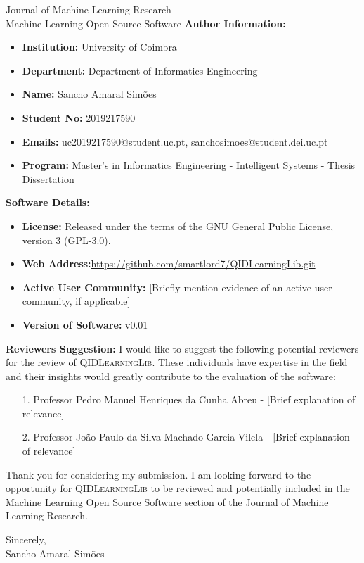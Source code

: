 \documentclass{letter}
\begin{document}
\begin{letter}{Journal of Machine Learning Research\\
    Machine Learning Open Source Software
}
\textbf{Author Information:}
\begin{itemize}
    \item \textbf{Institution:} University of Coimbra
    \item \textbf{Department:} Department of Informatics Engineering
    \item \textbf{Name:} Sancho Amaral Simões
    \item \textbf{Student No:} 2019217590
    \item \textbf{Emails:} uc2019217590@student.uc.pt, sanchosimoes@student.dei.uc.pt
    \item \textbf{Program:} Master's in Informatics Engineering - Intelligent Systems - Thesis Dissertation
\end{itemize}

\textbf{Software Details:}
\begin{itemize}
    \item \textbf{License:} Released under the terms of the GNU General Public License, version 3 (GPL-3.0).
    \item \textbf{Web Address:}\url{https://github.com/smartlord7/QIDLearningLib.git}
    \item \textbf{Active User Community:} [Briefly mention evidence of an active user community, if applicable]
    \item \textbf{Version of Software:} v0.01
\end{itemize}

\textbf{Reviewers Suggestion:}
I would like to suggest the following potential reviewers for the review of \textsc{QIDLearningLib}. These individuals have expertise in the field and their insights would greatly contribute to the evaluation of the software:
\begin{enumerate}
    \item [1.] Professor Pedro Manuel Henriques da Cunha Abreu - [Brief explanation of relevance]
    \item [2.] Professor João Paulo da Silva Machado Garcia Vilela - [Brief explanation of relevance]
\end{enumerate}

Thank you for considering my submission. I am looking forward to the opportunity for \textsc{QIDLearningLib} to be reviewed and potentially included in the Machine Learning Open Source Software section of the Journal of Machine Learning Research.

\closing{Sincerely, \\
Sancho Amaral Simões}

\end{letter}
\end{document}
